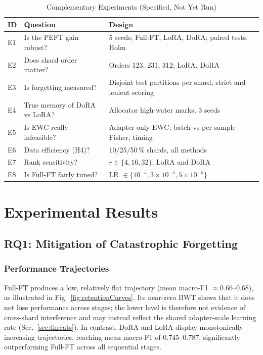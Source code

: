 \documentclass[11pt,a4paper]{article}
\begin{document}
\begin{table}[!htbp]
\caption{Complementary Experiments (Specified, Not Yet Run)}
\label{tab:complementary}
\centering
\small
\begin{tabular}{p{1.2cm}p{6.8cm}p{7.2cm}}
\toprule
\textbf{ID} & \textbf{Question} & \textbf{Design} \\
\midrule
E1 & Is the PEFT gain robust? & 5 seeds; Full-FT, LoRA, DoRA; paired tests, Holm \\
E2 & Does shard order matter? & Orders 123, 231, 312; LoRA, DoRA \\
E3 & Is forgetting measured? & Disjoint test partitions per shard; strict and lenient scoring \\
E4 & True memory of DoRA vs LoRA? & Allocator high-water marks, 3 seeds \\
E5 & Is EWC really infeasible? & Adapter-only EWC; batch vs per-sample Fisher; timing \\
E6 & Data efficiency (H4)? & 10/25/50\,\% shards, all methods \\
E7 & Rank sensitivity? & $r\in\{4,16,32\}$, LoRA and DoRA \\
E8 & Is Full-FT fairly tuned? & LR $\in\{10^{-5},3{\times}10^{-5},5{\times}10^{-5}\}$ \\
\bottomrule
\end{tabular}
\end{table}

\section{Experimental Results}
\label{sec:results}

\subsection{RQ1: Mitigation of Catastrophic Forgetting}

\subsubsection{Performance Trajectories}

Full-FT produces a low, relatively flat trajectory (mean macro-F1
$\approx 0.66$--$0.68$), as illustrated in Fig.~\ref{fig:retentionCurves}.
Its near-zero BWT shows that it does not lose performance across stages;
the lower level is therefore not evidence of cross-shard interference and
may instead reflect the shared adapter-scale learning rate (Sec.~\ref{sec:threats}).
In contrast, DoRA and LoRA display monotonically increasing trajectories,
reaching mean macro-F1 of $0.745$--$0.787$, significantly outperforming
Full-FT across all sequential stages.
\end{document}
